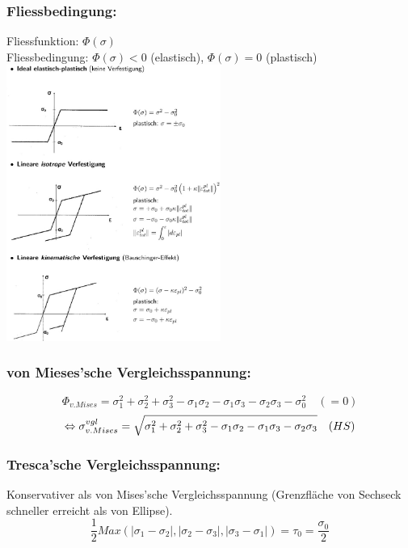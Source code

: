 \documentclass[a4paper,10pt]{article}
\begin{document}
\begin{multicols*}{3}
        \subsubsection{Fliessbedingung:}
            Fliessfunktion: $\Phi(\sigma)$\\
            Fliessbedingung: $\Phi(\sigma)<0$ (elastisch), $\Phi(\sigma)=0$ (plastisch)
            \includegraphics[width=70mm]{images/Fliessbedingungen.jpeg}
        \subsubsection{von Mieses'sche Vergleichsspannung:}
            \[\Phi_{v.Mises}= \sigma_1^2+\sigma_2^2+\sigma_3^2-\sigma_1\sigma_2-\sigma_1\sigma_3-\sigma_2\sigma_3 -\sigma_0^2\quad(=0)\]
            \[\Leftrightarrow \sigma_{v. Mises}^{vgl}= \sqrt{\sigma_1^2+\sigma_2^2+\sigma_3^2-\sigma_1\sigma_2-\sigma_1\sigma_3-\sigma_2\sigma_3} \quad\textrm(HS)\]
        \subsubsection{Tresca'sche Vergleichsspannung:}
            Konservativer als von Mises'sche Vergleichsspannung (Grenzfläche von Sechseck schneller erreicht als von Ellipse).
            \[\frac{1}{2}Max(|\sigma_1-\sigma_2|,|\sigma_2-\sigma_3|,|\sigma_3-\sigma_1|)=\tau_0=\frac{\sigma_0}{2}\]

\end{multicols*}
\end{document}
